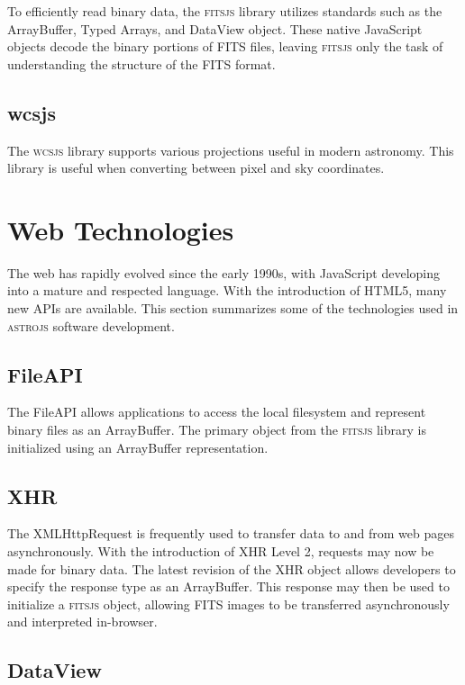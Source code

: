 To efficiently read binary data, the \textsc{fitsjs} library utilizes standards such as the ArrayBuffer, Typed Arrays, and DataView object.  These native JavaScript objects decode the binary portions of FITS files, leaving \textsc{fitsjs} only the task of understanding the structure of the FITS format.

\subsection{wcsjs}

The \textsc{wcsjs} library supports various projections \citep{2002A&A...395.1077C} useful in modern astronomy.  This library is useful when converting between pixel and sky coordinates.

\section{Web Technologies}

The web has rapidly evolved since the early 1990s, with JavaScript developing into a mature and respected language.  With the introduction of HTML5, many new APIs are available.  This section summarizes some of the technologies used in \textsc{astrojs} software development.

\subsection{FileAPI}

The FileAPI \citep{W3CFileAPI} allows applications to access the local filesystem and represent binary files as an ArrayBuffer.  The primary object from the \textsc{fitsjs} library is initialized using an ArrayBuffer representation.

\subsection{XHR}

The XMLHttpRequest \citep{W3CXHR} is frequently used to transfer data to and from web pages asynchronously.  With the introduction of XHR Level 2, requests may now be made for binary data.  The latest revision of the XHR object allows developers to specify the response type as an ArrayBuffer.  This response may then be used to initialize a \textsc{fitsjs} object, allowing FITS images to be transferred asynchronously and interpreted in-browser.

\subsection{DataView}

